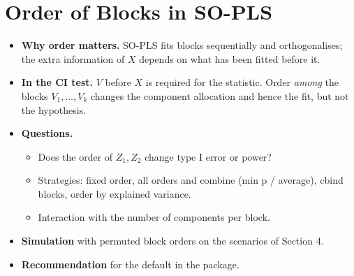 \documentclass[10pt,leqno]{amsart}
\begin{document}
\section{Order of Blocks in SO-PLS}
\begin{itemize}
\item \textbf{Why order matters.} SO-PLS fits blocks sequentially and orthogonalises;
  the extra information of $X$ depends on what has been fitted before it.
\item \textbf{In the CI test.} $V$ before $X$ is required for the statistic. Order
  \emph{among} the blocks $V_1,\dots,V_k$ changes the component allocation and
  hence the fit, but not the hypothesis.
\item \textbf{Questions.}
  \begin{itemize}
  \item Does the order of $Z_1,Z_2$ change type I error or power?
  \item Strategies: fixed order, all orders and combine (min p / average),
    cbind blocks, order by explained variance.
  \item Interaction with the number of components per block.
  \end{itemize}
\item \textbf{Simulation} with permuted block orders on the scenarios of Section 4.
\item \textbf{Recommendation} for the default in the package.
\end{itemize}

\end{document}
